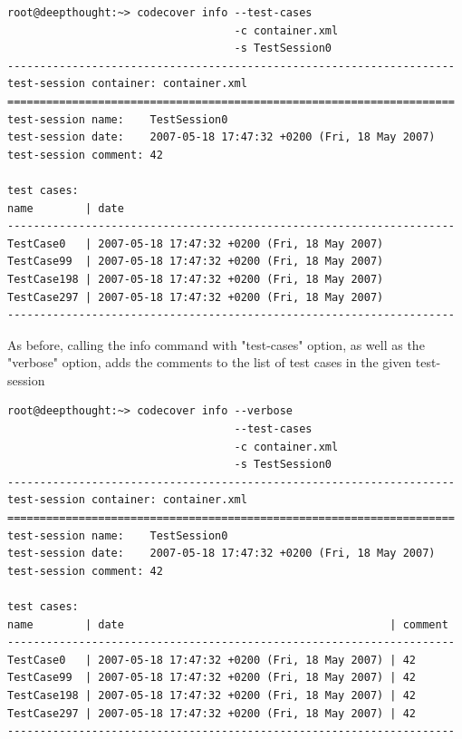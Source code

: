 \begin{verbatim}
root@deepthought:~> codecover info --test-cases 
                                   -c container.xml 
                                   -s TestSession0
---------------------------------------------------------------------
test-session container: container.xml
=====================================================================
test-session name:    TestSession0
test-session date:    2007-05-18 17:47:32 +0200 (Fri, 18 May 2007)
test-session comment: 42

test cases:
name        | date                                        
---------------------------------------------------------------------
TestCase0   | 2007-05-18 17:47:32 +0200 (Fri, 18 May 2007)
TestCase99  | 2007-05-18 17:47:32 +0200 (Fri, 18 May 2007)
TestCase198 | 2007-05-18 17:47:32 +0200 (Fri, 18 May 2007)
TestCase297 | 2007-05-18 17:47:32 +0200 (Fri, 18 May 2007)
---------------------------------------------------------------------
\end{verbatim}

As before, calling the info command with "test-cases" option, as well as the "verbose" option, adds the comments to the list of test cases in the given test-session

\begin{verbatim}
root@deepthought:~> codecover info --verbose 
                                   --test-cases 
                                   -c container.xml 
                                   -s TestSession0
---------------------------------------------------------------------
test-session container: container.xml
=====================================================================
test-session name:    TestSession0
test-session date:    2007-05-18 17:47:32 +0200 (Fri, 18 May 2007)
test-session comment: 42

test cases:
name        | date                                         | comment
---------------------------------------------------------------------
TestCase0   | 2007-05-18 17:47:32 +0200 (Fri, 18 May 2007) | 42
TestCase99  | 2007-05-18 17:47:32 +0200 (Fri, 18 May 2007) | 42
TestCase198 | 2007-05-18 17:47:32 +0200 (Fri, 18 May 2007) | 42
TestCase297 | 2007-05-18 17:47:32 +0200 (Fri, 18 May 2007) | 42
---------------------------------------------------------------------
\end{verbatim}


